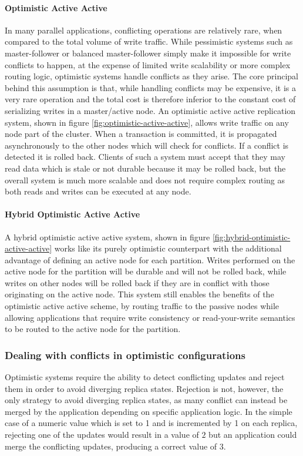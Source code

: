 \paragraph{Optimistic Active Active}
In many parallel applications, conflicting operations are relatively rare, when compared to the total volume of write traffic.
While pessimistic systems such as master-follower or balanced master-follower simply make it impossible for write conflicts to happen, at the expense of limited write scalability or more complex routing logic, optimistic systems handle conflicts as they arise.
The core principal behind this assumption is that, while handling conflicts may be expensive, it is a very rare operation and the total cost is therefore inferior to the constant cost of serializing writes in a master/active node.
An optimistic active active replication system, shown in figure \ref{fig:optimistic-active-active}, allows write traffic on any node part of the cluster.
When a transaction is committed, it is propagated asynchronously to the other nodes which will check for conflicts. If a conflict is detected it is rolled back.
Clients of such a system must accept that they may read data which is stale or not durable because it may be rolled back, but the overall system is much more scalable and does not require complex routing as both reads and writes can be executed at any node.

\paragraph{Hybrid Optimistic Active Active}
A hybrid optimistic active active system, shown in figure \ref{fig:hybrid-optimistic-active-active} works like its purely optimistic counterpart with the additional advantage of defining an active node for each partition.
Writes performed on the active node for the partition will be durable and will not be rolled back, while writes on other nodes will be rolled back if they are in conflict with those originating on the active node.
This system still enables the benefits of the optimistic active active scheme, by routing traffic to the passive nodes while allowing applications that require write consistency or read-your-write semantics to be routed to the active node for the partition.

\subsubsection{Dealing with conflicts in optimistic configurations}
Optimistic systems require the ability to detect conflicting updates and reject them in order to avoid diverging replica states.
Rejection is not, however, the only strategy to avoid diverging replica states, as many conflict can instead be merged by the application depending on specific application logic.
In the simple case of a numeric value which is set to 1 and is incremented by 1 on each replica, rejecting one of the updates would result in a value of $2$ but an application could merge the conflicting updates, producing a correct value of 3.

